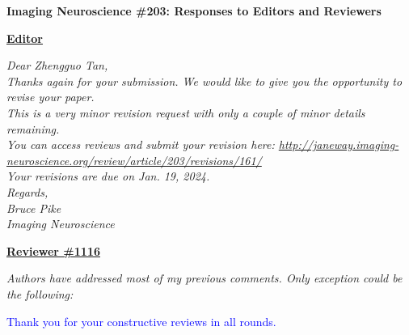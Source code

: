 \documentclass[a4paper,11pt,twoside]{report}
\begin{document}
\begin{center}
	{\large\textbf{Imaging Neuroscience \#203: Responses to Editors and Reviewers}}
\end{center}


\noindent \underline{\textbf{Editor}}

\noindent \textit{Dear Zhengguo Tan,\\
\newline
Thanks again for your submission. We would like to give you the opportunity to revise your paper.\\
\newline
This is a very minor revision request with only a couple of minor details remaining.\\
\newline
You can access reviews and submit your revision here: \url{http://janeway.imaging-neuroscience.org/review/article/203/revisions/161/}\\
\newline
Your revisions are due on Jan. 19, 2024.\\
\newline
Regards,\\
Bruce Pike\\
\newline
Imaging Neuroscience}

\vspace{2em}

\noindent \underline{\textbf{Reviewer \#1116}}

\noindent \textit{Authors have addressed most of my previous comments. Only exception could be the following:}

\hspace{1em} \textcolor{blue}{Thank you for your constructive reviews in all rounds.}
\end{document}
